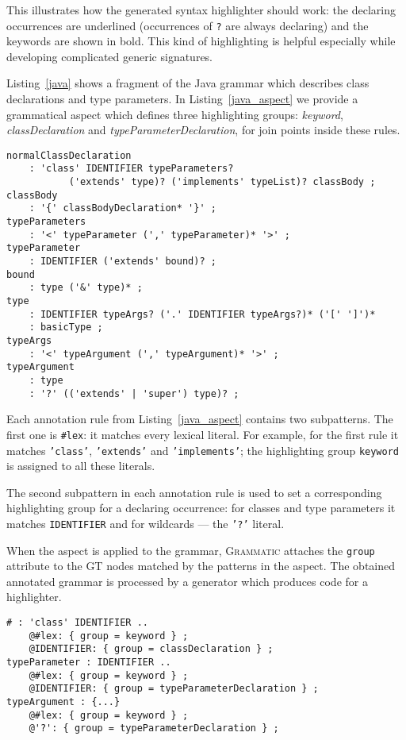 \documentclass{IOS-Book-Article}     %
\newcommand{\lstref}[1]{Listing~\ref{#1}}
\newcommand{\tool}[1]{\textsc{#1}}
\newcommand{\Grammatic}[0]{\tool{Grammatic}}
\begin{document}
This illustrates how the generated syntax highlighter should work: the declaring occurrences are underlined (occurrences of \texttt{?} are always declaring) and the keywords are shown in bold. This kind of highlighting is helpful especially while developing complicated generic signatures.

\lstref{java} shows a fragment of the Java grammar \cite{JLS} which describes class declarations and type parameters. In \lstref{java_aspect} we provide a grammatical aspect which defines three highlighting groups: \emph{keyword}, \emph{classDeclaration} and \emph{typeParameterDeclaration}, for join points inside these rules.

\begin{lstlisting}[language=Grammatic,caption=Class declaration syntax in Java 5,label=java,float]
normalClassDeclaration
	: 'class' IDENTIFIER typeParameters? 
           ('extends' type)? ('implements' typeList)? classBody ;
classBody
	: '{' classBodyDeclaration* '}' ;
typeParameters
	: '<' typeParameter (',' typeParameter)* '>' ;
typeParameter
	: IDENTIFIER ('extends' bound)? ;
bound
	: type ('&' type)* ;
type
	: IDENTIFIER typeArgs? ('.' IDENTIFIER typeArgs?)* ('[' ']')*
	: basicType ;
typeArgs
	: '<' typeArgument (',' typeArgument)* '>' ;
typeArgument
	: type
	: '?' (('extends' | 'super') type)? ;
\end{lstlisting}

\lstset{language=Grammatic}
Each annotation rule from \lstref{java_aspect} contains two subpatterns. The first one is \texttt{\#lex}: it matches every lexical literal. For example, for the first rule it matches \texttt{'class'}, \texttt{'extends'} and \texttt{'implements'}; the highlighting group \texttt{keyword} is assigned to all these literals.

The second subpattern in each annotation rule is used to set a corresponding highlighting group for a declaring occurrence: for classes and type parameters it matches \texttt{IDENTIFIER} and for wildcards --- the \texttt{'?'} literal.

When the aspect is applied to the grammar, \Grammatic{} attaches the \texttt{group} attribute to the GT nodes matched by the patterns in the aspect. The obtained annotated grammar is processed by a generator which produces code for a highlighter.

\begin{lstlisting}[language=Grammatic,caption=Highlighting aspect for class declarations in Java,float,label=java_aspect]
# : 'class' IDENTIFIER ..
	@#lex: { group = keyword } ;
	@IDENTIFIER: { group = classDeclaration } ;
typeParameter : IDENTIFIER ..
	@#lex: { group = keyword } ;
	@IDENTIFIER: { group = typeParameterDeclaration } ;
typeArgument : {...}
	@#lex: { group = keyword } ;
	@'?': { group = typeParameterDeclaration } ;
\end{lstlisting}
\end{document}
